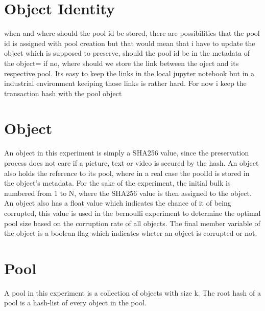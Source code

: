 \section{Object Identity}
when and where should the pool id be stored, there are possibilities that the pool id is assigned with pool creation but that would mean that i have to update the object which is supposed to preserve, should the pool id be in the metadata of the object= if no, where should we store the link between the oject and its respective pool. Its easy to keep the links in the local jupyter notebook but in a industrial environment keeiping those links is rather hard. For now i keep the transaction hash with the pool object
\section{Object}
An object in this experiment is simply a SHA256 value, since the preservation process does not care if a picture, text or video is secured by the hash. An object also holds the reference to its pool, where in a real case the poolId is stored in the object's metadata. For the sake of the experiment, the initial bulk is numbered from 1 to N, where the SHA256 value is then assigned to the object. An object also has a float value which indicates the chance of it of being corrupted, this value is used in the bernoulli experiment to determine the optimal pool size based on the corruption rate of all objects. The final member variable of the object is a boolean flag which indicates wheter an object is corrupted or not.

\section{Pool}
A pool in this experiment is a collection of objects with size k. The root hash of a pool is a hash-list of every object in the pool.
